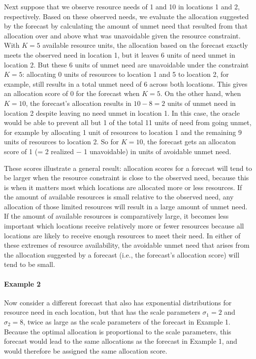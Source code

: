 \documentclass{article}\usepackage[]{graphicx}\usepackage[]{xcolor}
\providecommand{\DIFaddbegin}{} %
\providecommand{\DIFaddend}{} %
\newcommand{\DIFaddincludegraphics}[2][]{{\color{blue}\fbox{\DIFOincludegraphics[#1]{#2}}}} %
\DeclareRobustCommand{\DIFaddbegin}{\DIFOaddbegin \let\includegraphics\DIFaddincludegraphics} %
\DeclareRobustCommand{\DIFaddend}{\DIFOaddend \let\includegraphics\DIFOincludegraphics} %
\begin{document}
Next suppose that we observe resource needs of 1 and 10 in locations 1 and 2, respectively. Based on these observed
needs, we evaluate the allocation suggested by the forecast by calculating the amount of unmet need that resulted from
that allocation over and above what was unavoidable given the resource constraint. With $K = 5$ available resource
units, the allocation based on the forecast exactly meets the observed need in location 1, but it leaves 6 units of need
unmet in location 2. But these 6 units of unmet need are unavoidable under the constraint $K=5$: allocating 0 units of
resources to location 1 and 5 to location 2, for example, still results in a total unmet need of 6 across both
locations. This gives an allocation score of 0 for the forecast when $K = 5$. On the other hand, when $K = 10$, the
forecast's allocation results in $10 - 8 = 2$ units of unmet need in location 2 despite leaving no need unmet in
location 1. In this case, the oracle would be able to prevent all but 1 of the total 11 units of need from going unmet,
for example by allocating 1 unit of resources to location 1 and the remaining 9 units of resources to location 2. So for
$K = 10$, the forecast gets an allocaton score of 1 (= 2 realized $-$ 1 unavoidable) in units of avoidable unmet need.

These scores illustrate a general result: allocation scores for a forecast will tend to be larger when the resource
constraint is close to the observed need, because this is when it matters most which locations are allocated more or
less resources. If the amount of available resources is small relative to the observed need, any allocation of those
limited resources will result in a large amount of unmet need. If the amount of available resources is comparatively
large, it becomes less important which locations receive relatively more or fewer resources because all locations are
likely to
receive enough resources to meet their need. In either of these extremes of resource availability, the avoidable unmet
need that arises from the allocation suggested by a forecast (i.e., the forecast's allocation score) will tend to be
small.

\paragraph{Example 2} \DIFaddbegin \label{examp2} \DIFaddend Now consider a different forecast that also has exponential distributions for resource need in
each location, but that has the scale parameters $\sigma_1 = 2$ and $\sigma_2 = 8$, twice as large as the scale
parameters of the forecast in Example 1. Because the optimal allocation is proportional to the scale parameters, this
forecast would lead to the same allocations as the forecast in Example 1, and would therefore be assigned the same
allocation score.
\end{document}
